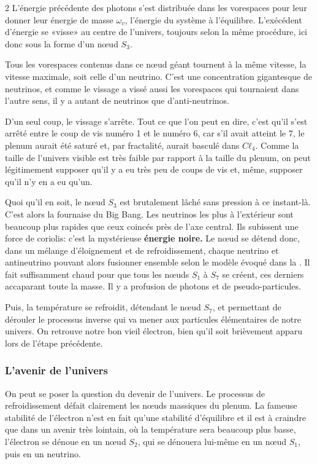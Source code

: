 \begin{multicols}{2}
L'énergie précédente des photons s'est distribuée dans les vorespaces
pour leur donner leur énergie de masse $\omega_v$, l'énergie du système à
l'équilibre. L'exécédent d'énergie se «visse» au centre de l'univers,
toujours selon la même procédure, ici donc sous la forme d'un nœud
$S_3$.

Tous les vorespaces contenus dans ce nœud géant tournent à la même
vitesse, la vitesse maximale, soit celle d'un neutrino. C'est une
concentration gigantesque de neutrinos, et comme le vissage a vissé
aussi les vorespaces qui tournaient dans l'autre sens, il y a autant
de neutrinos que d'anti-neutrinos.

D'un seul coup, le vissage s'arrête. Tout ce que l'on peut en dire, c'est
qu'il s'est arrêté entre le coup de vis numéro 1 et le numéro 6, car
s'il avait atteint le 7, le plenum aurait été saturé et, par
fractalité, aurait basculé dans $Cℓ_4$. Comme la taille de l'univers
visible est très faible par rapport à la taille du plenum, on peut
légitimement supposer qu'il y a eu très peu de coups de vis et, même,
supposer qu'il n'y en a eu qu'un.

Quoi qu'il en soit, le nœud $S_3$ est brutalement lâché sans pression à
ce instant-là. C'est alors la fournaise du Big Bang. Les neutrinos les plus à
l'extérieur sont beaucoup plus rapides que ceux coincés près de l'axe
central. Ils subissent une force de coriolis: c'est la mystérieuse
\textbf{énergie noire.} Le nœud se détend donc, dans un mélange d'éloignement
et de refroidissement, chaque neutrino et antineutrino pouvant alors
fusionner ensemble selon le modèle évoqué dans la \PQ. Il
fait suffisamment chaud pour que tous les nœuds $S_1$ à $S_7$ se créent,
ces derniers accaparant toute la masse. Il y a profusion de photons et
de pseudo-particules.

Puis, la température se refroidit, détendant le nœud $S_7$, et
permettant de dérouler le processus inverse qui va mener aux
particules élémentaires de notre univers. On retrouve notre bon vieil
électron, bien qu'il soit brièvement apparu lors de l'étape précédente.

\subsubsection{L'avenir de l'univers}

On peut se poser la question du devenir de l'univers. Le processus de
refroidissement défait clairement les nœuds massiques du plenum. La
fameuse stabilité de l'électron n'est en fait qu'une stabilité
d'équilibre et il est à craindre que dans un avenir très lointain, où
la température sera beaucoup plus basse, l'électron se dénoue en un
nœud $S_2$, qui se dénouera lui-même en un nœud $S_1$, puis en un neutrino.


\end{multicols}
